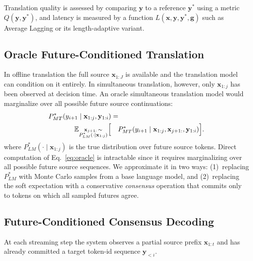 Translation quality is assessed by comparing $\mathbf{y}$ to a reference
$\mathbf{y}^*$ using a metric $Q(\mathbf{y}, \mathbf{y}^*)$, and latency is
measured by a function $L(\mathbf{x}, \mathbf{y}, \mathbf{y}^*, \mathbf{g})$
such as Average Lagging or its length-adaptive
variant.

\subsection{Oracle Future-Conditioned Translation}

In offline translation the full source $\mathbf{x}_{1:J}$ is available and the
translation model can condition on it entirely. In simultaneous translation,
however, only $\mathbf{x}_{1:j}$ has been observed at decision time. An oracle
simultaneous translation model would marginalize over all possible future
source continuations:
\begin{equation}
\begin{aligned}
P^*_{MT}\!\left(y_{i+1} \mid \mathbf{x}_{1:j}, \mathbf{y}_{1:i}\right)
&= \\
\mathbb{E}_{\substack{\mathbf{x}_{j+1:}\,\sim\\[-0.2ex] P^*_{LM}(\cdot \mid \mathbf{x}_{1:j})}}
\Bigl[
&\quad P^*_{MT}\!\left(y_{i+1} \mid \mathbf{x}_{1:j}, \mathbf{x}_{j+1:}, \mathbf{y}_{1:i}\right)
\Bigr].
\end{aligned}
\label{eq:oracle}
\end{equation}
where $P^*_{LM}(\cdot \mid \mathbf{x}_{1:j})$ is the true distribution over
future source tokens. Direct computation of Eq.~\ref{eq:oracle} is intractable
since it requires marginalizing over all possible future source sequences. We
approximate it in two ways: (1)~replacing $P^*_{LM}$ with Monte Carlo samples
from a base language model, and (2)~replacing the soft expectation with a
conservative \emph{consensus} operation that commits only to tokens on which
all sampled futures agree.

\subsection{Future-Conditioned Consensus Decoding}

At each streaming step the system observes a partial source prefix
$\mathbf{x}_{1:t}$ and has already committed a target token-id sequence
$\mathbf{y}_{<i}$.

